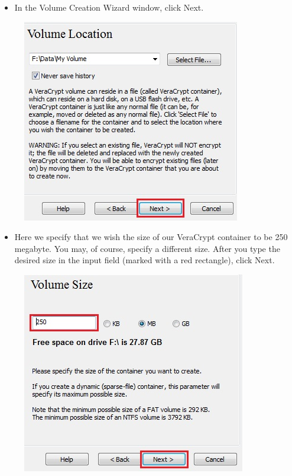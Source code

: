 \documentclass{tufte-handout}
\begin{document}
\begin{enumerate}
	\begin{itemize}
		\item  In the Volume Creation Wizard window, click Next.
	\end{itemize}
	\begin{figure}%
		\includegraphics[width=\linewidth]{img/vc_install_6.png}
	\end{figure}
	\begin{itemize}
		\item  Here we specify that we wish the size of our VeraCrypt container to be 250 megabyte. You may, of course, specify a different size. After you type the desired size in the input field (marked with a red rectangle), click Next.
	\end{itemize}
	\begin{figure}%
		\includegraphics[width=\linewidth]{img/vc_install_7.png}

\end{figure}
\end{enumerate}
\end{document}

